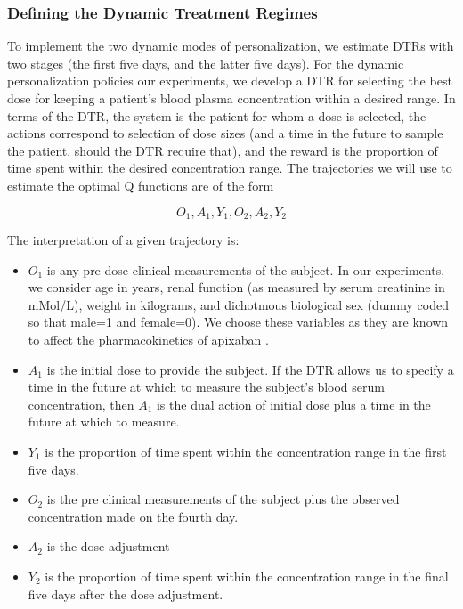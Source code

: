\subsubsection{Defining the Dynamic Treatment Regimes}

To implement the two dynamic modes of personalization, we estimate DTRs with two stages (the first five days, and the latter five days).  For the dynamic personalization policies our experiments, we develop a DTR for selecting the best dose for keeping a patient’s blood plasma concentration within a desired range.  In terms of the DTR, the system is the patient for whom a dose is selected, the actions correspond to selection of dose sizes (and a time in the future to sample the patient, should the DTR require that), and the reward is the proportion of time spent within the desired concentration range. The trajectories we will use to estimate the optimal Q functions are of the form

\begin{equation}\label{key}
O_1, A_1, Y_1, O_2, A_2, Y_2
\end{equation}

\noindent The interpretation of a given trajectory is:
\begin{itemize}
	\item $ O_1 $ is any pre-dose clinical measurements of the subject.  In our experiments, we consider age in years, renal function (as measured by serum creatinine in mMol/L), weight in kilograms, and dichotmous biological sex (dummy coded so that male=1 and female=0).  We choose these variables as they are known to affect the pharmacokinetics of apixaban \cite{byon2019apixaban}.  
	\item $ A_1 $ is the initial dose to provide the subject.  If the DTR allows us to specify a time in the future at which to measure the subject’s blood serum concentration, then $A_1$ is the dual action of initial dose plus a time in the future at which to measure.
	\item $ Y_1 $ is the proportion of time spent within the concentration range in the first five days.
	\item $ O_2 $ is the pre clinical measurements of the subject plus the observed concentration made on the fourth day.
	\item $ A_2 $ is the dose adjustment
	\item $ Y_2 $ is the proportion of time spent within the concentration range in the final five days after the dose adjustment.
\end{itemize}

